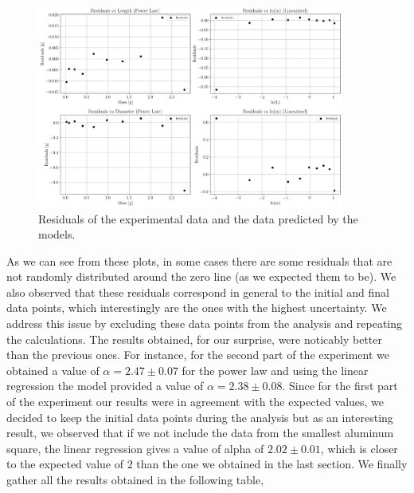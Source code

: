 \documentclass[a4paper,12pt]{article}
\begin{document}
\begin{figure}[h!]
    \centering
    \includegraphics[width = 0.9\textwidth]{residuals.png}
    \caption{Residuals of the experimental data and the data predicted by the models.}
    \label{fig:residuals}
\end{figure}
 
As we can see from these plots, in some cases there are some residuals that are not randomly distributed 
around the zero line (as we expected them to be). We also observed that these residuals correspond in general 
to the initial and final data points, which interestingly are the ones with the highest uncertainty. We address 
this issue by excluding these data points from the analysis and repeating the calculations. The results obtained, 
for our surprise, were noticably better than the previous ones. For instance, for the second part of the experiment
we obtained a value of $\alpha = 2.47 \pm 0.07$ for the power law and using the linear regression the model provided 
a value of $\alpha = 2.38 \pm 0.08$. Since for the first part of the experiment our results were in agreement with the
expected values, we decided to keep the initial data points during the analysis but as an interesting result, we 
observed that if we not include the data from the smallest aluminum square, the linear regression gives a value of 
alpha of $2.02 \pm 0.01$, which is closer to the expected value of $2$ than the one we obtained in the last section. 
We finally gather all the results obtained in the following table, 
\end{document}

